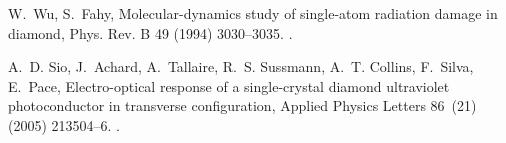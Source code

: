 \documentclass{CusanoOne}
\begin{document}
\begin{thebibliography}{99}

W.~Wu, S.~Fahy, Molecular-dynamics study of single-atom radiation damage in
  diamond, Phys. Rev. B 49 (1994) 3030--3035.
\newblock \href {http://dx.doi.org/10.1103/PhysRevB.49.3030}
  {}.

A.~D. Sio, J.~Achard, A.~Tallaire, R.~S. Sussmann, A.~T. Collins, F.~Silva,
  E.~Pace, Electro-optical response of a single-crystal diamond ultraviolet
  photoconductor in transverse configuration, Applied Physics Letters 86~(21)
  (2005) 213504--6.
\newblock \href {http://dx.doi.org/10.1063/1.1935039}
  {}.

\end{thebibliography}
\end{document}
